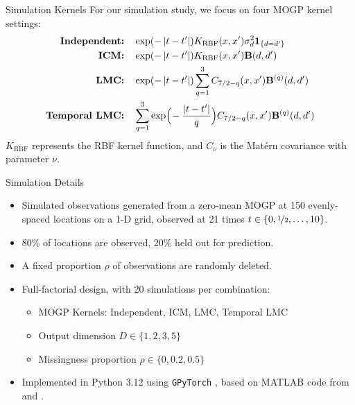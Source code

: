 \documentclass[dvipsnames, 11pt]{beamer}
\begin{document}
\begin{frame}{Simulation Kernels}
    For our simulation study, we focus on four MOGP kernel settings:
    {\small
    \begin{align*}
        \textbf{Independent:} &\quad \exp(-\abs{t - t'})K_{\textrm{RBF}}(x, x')\sigma^{2}_{d}\mathbf{1}_{\{d = d'\}}\\
        \textbf{ICM:} &\quad \exp(-\abs{t - t'})K_{\textrm{RBF}}(x, x')\bfB(d, d')\\
        \textbf{LMC:} &\quad \exp(-\abs{t - t'})\sum_{q=1}^{3}C_{7/2 - q}(x, x')\bfB^{(q)}(d, d')\\
        \textbf{Temporal LMC:} &\quad \sum_{q=1}^{3}\exp\!\Big(\!-\frac{\abs{t - t'}}{q}\Big)C_{7/2 - q}(x, x')\bfB^{(q)}(d, d')
    \end{align*}
    }
    $K_{\textrm{RBF}}$ represents the RBF kernel function, and $C_{\nu}$ is the Mat{\'e}rn covariance with parameter $\nu$. 
\end{frame}

\begin{frame}{Simulation Details}
    \begin{itemize}
        \item 
        Simulated observations generated from a zero-mean MOGP at 150 evenly-spaced locations on a 1-D grid, observed at 21 times $t \in \{0, \nicefrac{1}{2}, \dots, 10\}$.
        \item
        80\% of locations are observed, 20\% held out for prediction.
        \item
        A fixed proportion $\rho$ of observations are randomly deleted.
        \item
        Full-factorial design, with 20 simulations per combination:
        \begin{itemize}
            \item MOGP Kernels: Independent, ICM, LMC, Temporal LMC
            \item Output dimension $D \in \{1, 2, 3, 5\}$
            \item Missingness proportion $\rho \in \{0, 0.2, 0.5\}$
        \end{itemize}
        \item
        Implemented in Python 3.12 \citep{python-3-12-5} using \texttt{GPyTorch} \citep{GPyTorch-Library-2018}, based on MATLAB code from \citet{Carron-ML-Kalman-2016} and \citet{Todescato-Efficient-2020}. 
    \end{itemize}
\end{frame}
\end{document}
